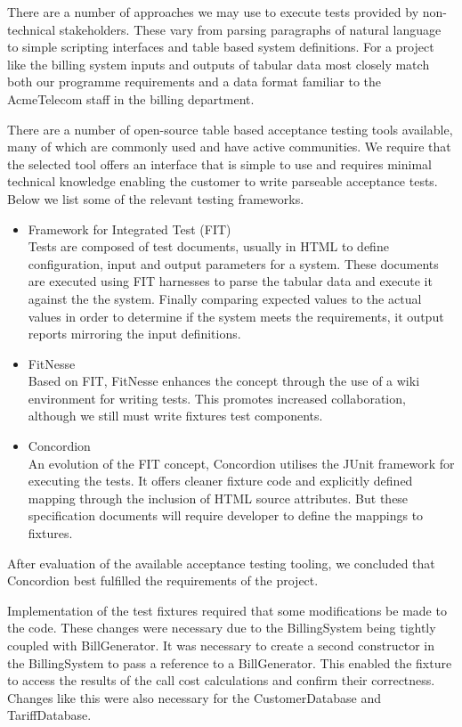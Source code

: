 \documentclass[pdftex,11pt,a4paper]{article}
\begin{document}
There are a number of approaches we may use to execute tests provided by non-technical stakeholders. These vary from parsing paragraphs of natural language to simple scripting interfaces and table based system definitions. For a project like the billing system inputs and outputs of tabular data most closely match both our programme requirements and a data format familiar to the AcmeTelecom staff in the billing department.

There are a number of open-source table based acceptance testing tools available, many of which are commonly used and have active communities. We require that the selected tool offers an interface that is simple to use and requires minimal technical knowledge enabling the customer to write parseable acceptance tests. Below we list some of the relevant testing frameworks.


\begin{itemize}
  \item Framework for Integrated Test (FIT)\\
Tests are composed of test documents, usually in HTML to define configuration, input and output parameters for a system. These documents are executed using FIT harnesses to parse the tabular data and execute it against the the system. Finally comparing expected values to the actual values in order to determine if the system meets the requirements, it output reports mirroring the input definitions. 
  \item FitNesse\\
Based on FIT, FitNesse enhances the concept through the use of a wiki environment for writing tests. This promotes increased collaboration, although we still must write fixtures test components.
  \item Concordion\\
An evolution of the FIT concept, Concordion utilises the JUnit framework for executing the tests. It offers cleaner fixture code and explicitly defined mapping through the inclusion of HTML source attributes. But these specification documents will require developer to define the mappings to fixtures.
\end{itemize}

After evaluation of the available acceptance testing tooling, we concluded that Concordion best fulfilled the requirements of the project. 

Implementation of the test fixtures required that some modifications be made to the code. These changes were necessary due to the BillingSystem being tightly coupled with BillGenerator. It was necessary to create a second constructor in the BillingSystem to pass a reference to a BillGenerator. This enabled the fixture to access the results of the call cost calculations and confirm their correctness. Changes like this were also necessary for the CustomerDatabase and TariffDatabase. 
\end{document}
